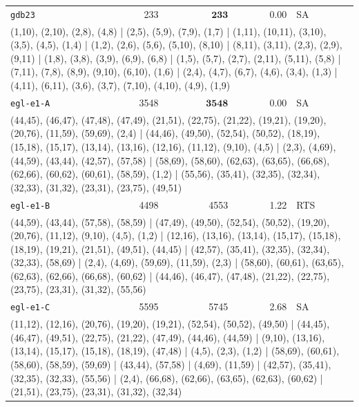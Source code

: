 \begin{longtable}{lrrrl}
\texttt{gdb23} & 233 & $\mathbf{233}$ & 0.00 & SA \\
\multicolumn{5}{p{0.96\linewidth}}{\tiny\raggedright\arraybackslash (1,10), (2,10), (2,8), (4,8) | (2,5), (5,9), (7,9), (1,7) | (1,11), (10,11), (3,10), (3,5), (4,5), (1,4) | (1,2), (2,6), (5,6), (5,10), (8,10) | (8,11), (3,11), (2,3), (2,9), (9,11) | (1,8), (3,8), (3,9), (6,9), (6,8) | (1,5), (5,7), (2,7), (2,11), (5,11), (5,8) | (7,11), (7,8), (8,9), (9,10), (6,10), (1,6) | (2,4), (4,7), (6,7), (4,6), (3,4), (1,3) | (4,11), (6,11), (3,6), (3,7), (7,10), (4,10), (4,9), (1,9)} \\[2pt]
\texttt{egl-e1-A} & 3548 & $\mathbf{3548}$ & 0.00 & SA \\
\multicolumn{5}{p{0.96\linewidth}}{\tiny\raggedright\arraybackslash (44,45), (46,47), (47,48), (47,49), (21,51), (22,75), (21,22), (19,21), (19,20), (20,76), (11,59), (59,69), (2,4) | (44,46), (49,50), (52,54), (50,52), (18,19), (15,18), (15,17), (13,14), (13,16), (12,16), (11,12), (9,10), (4,5) | (2,3), (4,69), (44,59), (43,44), (42,57), (57,58) | (58,69), (58,60), (62,63), (63,65), (66,68), (62,66), (60,62), (60,61), (58,59), (1,2) | (55,56), (35,41), (32,35), (32,34), (32,33), (31,32), (23,31), (23,75), (49,51)} \\[2pt]
\texttt{egl-e1-B} & 4498 & 4553 & 1.22 & RTS \\
\multicolumn{5}{p{0.96\linewidth}}{\tiny\raggedright\arraybackslash (44,59), (43,44), (57,58), (58,59) | (47,49), (49,50), (52,54), (50,52), (19,20), (20,76), (11,12), (9,10), (4,5), (1,2) | (12,16), (13,16), (13,14), (15,17), (15,18), (18,19), (19,21), (21,51), (49,51), (44,45) | (42,57), (35,41), (32,35), (32,34), (32,33), (58,69) | (2,4), (4,69), (59,69), (11,59), (2,3) | (58,60), (60,61), (63,65), (62,63), (62,66), (66,68), (60,62) | (44,46), (46,47), (47,48), (21,22), (22,75), (23,75), (23,31), (31,32), (55,56)} \\[2pt]
\texttt{egl-e1-C} & 5595 & 5745 & 2.68 & SA \\
\multicolumn{5}{p{0.96\linewidth}}{\tiny\raggedright\arraybackslash (11,12), (12,16), (20,76), (19,20), (19,21), (52,54), (50,52), (49,50) | (44,45), (46,47), (49,51), (22,75), (21,22), (47,49), (44,46), (44,59) | (9,10), (13,16), (13,14), (15,17), (15,18), (18,19), (47,48) | (4,5), (2,3), (1,2) | (58,69), (60,61), (58,60), (58,59), (59,69) | (43,44), (57,58) | (4,69), (11,59) | (42,57), (35,41), (32,35), (32,33), (55,56) | (2,4), (66,68), (62,66), (63,65), (62,63), (60,62) | (21,51), (23,75), (23,31), (31,32), (32,34)} \\[2pt]

\end{longtable}
